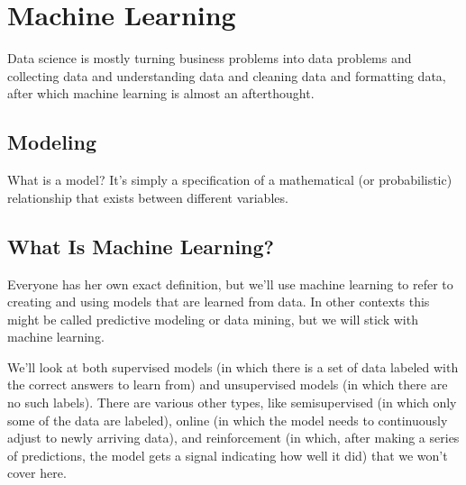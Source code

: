 \chapter{Machine Learning}
Data science is mostly turning business problems into data problems and collecting
data and understanding data and cleaning data and formatting data, after which
machine learning is almost an afterthought.
\section{Modeling}

What is a model? It’s simply a specification of a mathematical (or probabilistic) relationship that exists between different variables.

\section{What Is Machine Learning?}

Everyone has her own exact definition, but we’ll use machine learning to refer to creating and using models that are learned from data. In other contexts this might be
called predictive modeling or data mining, but we will stick with machine learning.

We’ll look at both supervised models (in which there is a set of data labeled with the
correct answers to learn from) and unsupervised models (in which there are no such
labels). There are various other types, like semisupervised (in which only some of the
data are labeled), online (in which the model needs to continuously adjust to newly
arriving data), and reinforcement (in which, after making a series of predictions, the
model gets a signal indicating how well it did) that we won’t cover here.